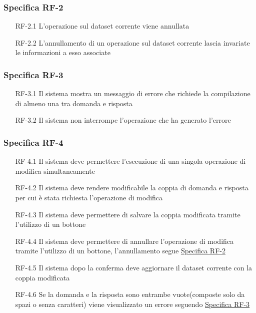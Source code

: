 \subsubsection{Specifica RF-2}
\label{subsubsec:RF-2}
\begin{enumerate}
    \item[RF-2.1] L'operazione sul dataset corrente viene annullata
    \item[RF-2.2] L'annullamento di un operazione sul dataset corrente lascia invariate le informazioni a esso associate 
\end{enumerate}

\subsubsection{Specifica RF-3}
\label{subsubsec:RF-3}
\begin{enumerate}
    \item[RF-3.1] Il sistema mostra un messaggio di errore che richiede la compilazione di almeno una tra domanda e risposta
    \item[RF-3.2] Il sistema non interrompe l'operazione che ha generato l'errore 
\end{enumerate}

\subsubsection{Specifica RF-4}
\label{subsubsec:RF-4}
\begin{enumerate}
    \item[RF-4.1] Il sistema deve permettere l'esecuzione di una singola operazione di modifica simultaneamente
    \item[RF-4.2] Il sistema deve rendere modificabile la coppia di domanda e risposta per cui è stata richiesta l'operazione di modifica
    \item[RF-4.3] Il sistema deve permettere di salvare la coppia modificata tramite l'utilizzo di un bottone
    \item[RF-4.4] Il sistema deve permettere di annullare l'operazione di modifica tramite l'utilizzo di un bottone, l'annullamento segue \hyperref[subsubsec:RF-2]{Specifica RF-2}
    \item[RF-4.5] Il sistema dopo la conferma deve aggiornare il dataset corrente con la coppia modificata
    \item[RF-4.6] Se la domanda e la risposta sono entrambe vuote(composte solo da spazi o senza caratteri) viene visualizzato un errore seguendo \hyperref[subsubsec:RF-3]{Specifica RF-3}
\end{enumerate}

